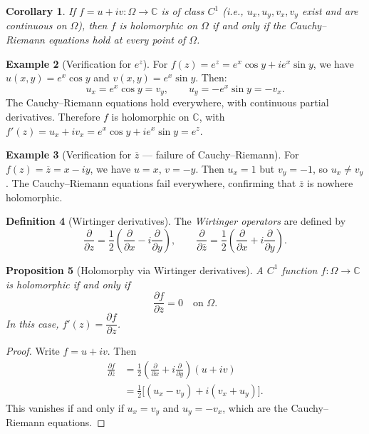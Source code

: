 \documentclass[12pt,a4paper,openany]{book}
\theoremstyle{definition}
\newtheorem{definition}{Definition}[chapter]
\newtheorem{example}[definition]{Example}
\theoremstyle{plain}
\newtheorem{proposition}[definition]{Proposition}
\newtheorem{corollary}[definition]{Corollary}
\theoremstyle{remark}
\newcommand{\C}{\mathbb{C}}
\newcommand{\conj}[1]{\overline{#1}}
\begin{document}
\begin{corollary}
\label{cor:C1-holo}
If $f=u+iv:\Omega\to\C$ is of class $C^1$ (i.e., $u_x,u_y,v_x,v_y$ exist and are continuous on $\Omega$), then $f$ is holomorphic on $\Omega$ if and only if the Cauchy--Riemann equations hold at every point of $\Omega$.
\end{corollary}

\begin{example}[Verification for $e^z$]
\label{ex:CR-exp}
For $f(z) = e^z = e^x\cos y + ie^x\sin y$, we have $u(x,y)=e^x\cos y$ and $v(x,y)=e^x\sin y$. Then:
\[
  u_x = e^x\cos y = v_y, \qquad u_y = -e^x\sin y = -v_x.
\]
The Cauchy--Riemann equations hold everywhere, with continuous partial derivatives. Therefore $f$ is holomorphic on $\C$, with $f'(z) = u_x+iv_x = e^x\cos y + ie^x\sin y = e^z$.
\end{example}

\begin{example}[Verification for $\conj{z}$ --- failure of Cauchy--Riemann]
\label{ex:CR-conjugate}
For $f(z)=\conj{z} = x-iy$, we have $u=x$, $v=-y$. Then $u_x=1$ but $v_y=-1$, so $u_x\neq v_y$. The Cauchy--Riemann equations fail everywhere, confirming that $\conj{z}$ is nowhere holomorphic.
\end{example}

\begin{definition}[Wirtinger derivatives]
\label{def:wirtinger}
The \emph{Wirtinger operators} are defined by
\[
  \frac{\partial}{\partial z} = \frac{1}{2}\left(\frac{\partial}{\partial x}-i\frac{\partial}{\partial y}\right), \qquad
  \frac{\partial}{\partial\conj{z}} = \frac{1}{2}\left(\frac{\partial}{\partial x}+i\frac{\partial}{\partial y}\right).
\]
\end{definition}

\begin{proposition}[Holomorphy via Wirtinger derivatives]
\label{prop:wirtinger-holo}
A $C^1$ function $f:\Omega\to\C$ is holomorphic if and only if
\[
  \frac{\partial f}{\partial\conj{z}} = 0 \quad\text{on }\Omega.
\]
In this case, $f'(z) = \dfrac{\partial f}{\partial z}$.
\end{proposition}

\begin{proof}
Write $f = u+iv$. Then
\begin{align*}
  \frac{\partial f}{\partial\conj{z}} &= \frac{1}{2}\left(\frac{\partial}{\partial x}+i\frac{\partial}{\partial y}\right)(u+iv) \\
  &= \frac{1}{2}\bigl[(u_x-v_y)+i(v_x+u_y)\bigr].
\end{align*}
This vanishes if and only if $u_x = v_y$ and $u_y = -v_x$, which are the Cauchy--Riemann equations.
\end{proof}
\end{document}
